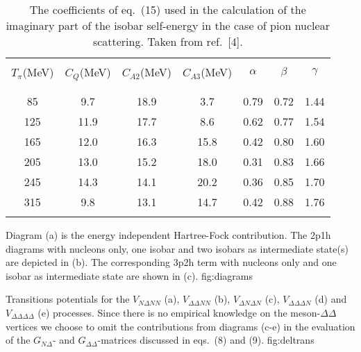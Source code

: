 \begin{table}[hbtp]
\caption{The coefficients of eq.\ (15) used in the calculation
of the imaginary part of the isobar self-energy in the case of pion
nuclear scattering. Taken from ref.\ [4].}
\begin{center}
\begin{tabular}{ccccrrr}
&&&&&&\\ \hline\hline
&&&&&&\\
\multicolumn{1}{c}{$T_{\pi}$(MeV)}&\multicolumn{1}{c}{$C_Q$(MeV)}&
\multicolumn{1}{c}{$C_{A2}$(MeV)}&\multicolumn{1}{c}{$C_{A3}$(MeV)}&
\multicolumn{1}{c}{$\alpha$}&\multicolumn{1}{c}{$\beta$}
&\multicolumn{1}{c}{$\gamma$}\\
&&&&&&\\ \hline
&&&&&&\\
85&9.7&18.9&3.7&0.79&0.72&1.44\\
125&11.9&17.7&8.6&0.62&0.77&1.54\\
165&12.0&16.3&15.8&0.42&0.80&1.60\\
205&13.0&15.2&18.0&0.31&0.83&1.66\\
245&14.3&14.1&20.2&0.36&0.85&1.70\\
315&9.8&13.1&14.7&0.42&0.88&1.76\\
&&&&&&\\ \hline\hline
\end{tabular}
\end{center}
\label{tab:delparam}
\end{table}
{Diagram (a) is the energy independent 
Hartree-Fock contribution. The 2p1h diagrams with nucleons only, 
one isobar and two isobars as intermediate state(s)
are depicted in (b). The corresponding 3p2h term with nucleons only
and one isobar as intermediate state are shown 
in (c).}
{fig:diagrams}
\clearpage


{Transitions potentials for the $V_{N\Delta NN}$ (a), $V_{\Delta\Delta NN}$
(b), $V_{\Delta N\Delta N}$ (c), $V_{\Delta\Delta\Delta N}$ (d) and
$V_{\Delta\Delta\Delta\Delta}$ (e) processes. Since there is no empirical 
knowledge on the meson-$\Delta\Delta$ vertices we choose to omit the contributions
from diagrams (c-e) in the evaluation of the $G_{N\Delta}$- and
$G_{\Delta\Delta}$-matrices discussed in eqs.\ (8) and (9).}
{fig:deltrans}

